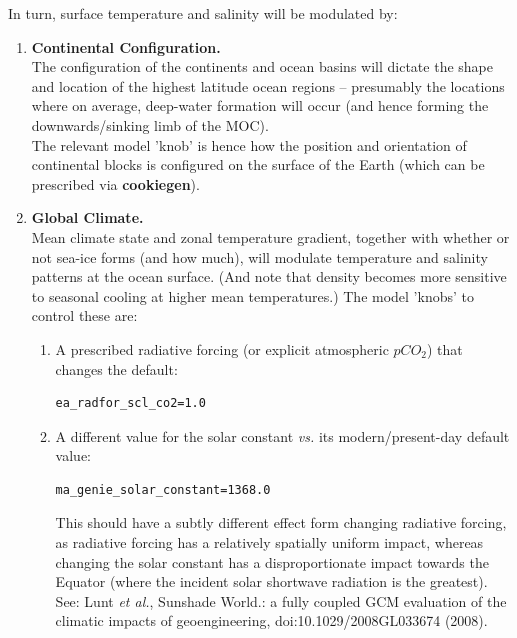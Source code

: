 In turn, surface temperature and salinity will be modulated by:

\vspace{1mm}
\begin{enumerate}
\vspace{1mm}
\item \textbf{Continental Configuration.}
\\The configuration of the continents and ocean basins will dictate the shape and location of the highest latitude ocean regions -- presumably the locations where on average, deep-water formation will occur (and hence forming the downwards/sinking limb of the MOC).
\\The relevant model 'knob' is hence how the position and orientation of continental blocks is configured on the surface of the Earth (which can be prescribed via \textbf{cookiegen}).
\vspace{1mm}
\item \textbf{Global Climate.}
\\Mean climate state and zonal temperature gradient, together with whether or not sea-ice forms (and how much), will modulate temperature and salinity patterns at the ocean surface. (And note that density becomes more sensitive to seasonal cooling at higher mean temperatures.) The model 'knobs' to control these are: 

\begin{enumerate}

\vspace{1mm}
\item A prescribed radiative forcing (or explicit atmospheric \(pCO_{2}\)) that changes the default:
\vspace{-1mm}\small\begin{verbatim}
ea_radfor_scl_co2=1.0
\end{verbatim}\normalsize\vspace{-1mm}

\vspace{1mm}
\item A different value for the solar constant \textit{vs.} its modern/present-day default value:
\vspace{-1mm}\small\begin{verbatim}
ma_genie_solar_constant=1368.0
\end{verbatim}\normalsize\vspace{-1mm}

This should have a subtly different effect form changing radiative forcing, as radiative forcing has a relatively spatially uniform impact, whereas changing the solar constant has a disproportionate impact towards the Equator (where the incident solar shortwave radiation is the greatest). See: Lunt \textit{et al.}, Sunshade World.: a fully coupled GCM evaluation of the climatic impacts of geoengineering, doi:10.1029/2008GL033674 (2008).


\end{enumerate}
\end{enumerate}
